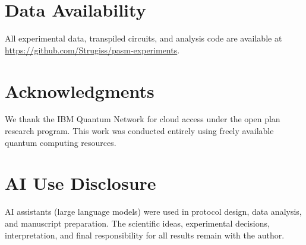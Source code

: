 ﻿\documentclass[12pt,a4paper]{article}
\begin{document}
\section*{Data Availability}

All experimental data, transpiled circuits, and analysis code are available at \url{https://github.com/Strugiss/pasm-experiments}.

\section*{Acknowledgments}

We thank the IBM Quantum Network for cloud access under the open plan research program. This work was conducted entirely using freely available quantum computing resources.

\section*{AI Use Disclosure}

AI assistants (large language models) were used in protocol design, data analysis, and manuscript preparation. The scientific ideas, experimental decisions, interpretation, and final responsibility for all results remain with the author.
\end{document}
